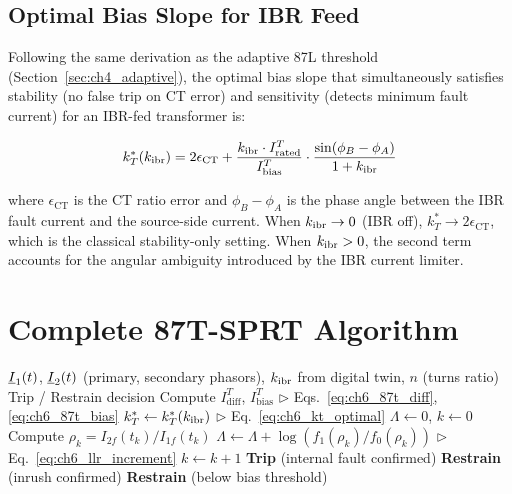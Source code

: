 \subsection{Optimal Bias Slope for IBR Feed}

Following the same derivation as the adaptive 87L threshold
(Section~\ref{sec:ch4_adaptive}), the optimal bias slope that simultaneously
satisfies stability (no false trip on CT error) and sensitivity (detects
minimum fault current) for an IBR-fed transformer is:

\begin{equation}
  k_T^*(k_\mathrm{ibr}) = 2\epsilon_\mathrm{CT} +
    \frac{k_\mathrm{ibr} \cdot I_\mathrm{rated}^T}{I_\mathrm{bias}^T}
    \cdot \frac{\sin(\phi_B - \phi_A)}{1 + k_\mathrm{ibr}}
  \label{eq:ch6_kt_optimal}
\end{equation}

where $\epsilon_\mathrm{CT}$ is the CT ratio error and $\phi_B - \phi_A$
is the phase angle between the IBR fault current and the source-side current.
When $k_\mathrm{ibr} \to 0$ (IBR off), $k_T^* \to 2\epsilon_\mathrm{CT}$, which is
the classical stability-only setting. When $k_\mathrm{ibr} > 0$, the second term
accounts for the angular ambiguity introduced by the IBR current limiter.

\section{Complete 87T-SPRT Algorithm}
\label{sec:ch6_algorithm}

\begin{algorithm}[htbp]
\caption{87T-SPRT Adaptive Transformer Differential Protection}
\label{alg:ch6_87t_sprt}
\begin{algorithmic}[1]
\Require $\underline{I}_1(t)$, $\underline{I}_2(t)$ (primary, secondary phasors),
         $k_\mathrm{ibr}$ from digital twin, $n$ (turns ratio)
\Ensure Trip / Restrain decision
\State Compute $I_\mathrm{diff}^T$, $I_\mathrm{bias}^T$ \hfill $\triangleright$ Eqs.~\eqref{eq:ch6_87t_diff},\eqref{eq:ch6_87t_bias}
\State $k_T^* \gets k_T^*(k_\mathrm{ibr})$ \hfill $\triangleright$ Eq.~\eqref{eq:ch6_kt_optimal}
  \State $\Lambda \gets 0$,\; $k \gets 0$
    \State Compute $\rho_k = I_{2f}(t_k) / I_{1f}(t_k)$
    \State $\Lambda \gets \Lambda + \log(f_1(\rho_k)/f_0(\rho_k))$
    \hfill $\triangleright$ Eq.~\eqref{eq:ch6_llr_increment}
    \State $k \gets k + 1$
  \EndWhile
    \State \Return \textbf{Trip} (internal fault confirmed)
  \Else
    \State \Return \textbf{Restrain} (inrush confirmed)
  \EndIf
\Else
  \State \Return \textbf{Restrain} (below bias threshold)
\EndIf
\end{algorithmic}
\end{algorithm}

